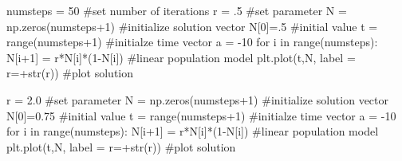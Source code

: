 \documentclass[
  letterpaper,
  DIV=11,
  numbers=noendperiod]{scrreprt}
\newenvironment{Shaded}{\begin{snugshade}}{\end{snugshade}}
\newcommand{\BuiltInTok}[1]{\textcolor[rgb]{0.00,0.23,0.31}{#1}}
\newcommand{\CommentTok}[1]{\textcolor[rgb]{0.37,0.37,0.37}{#1}}
\newcommand{\ControlFlowTok}[1]{\textcolor[rgb]{0.00,0.23,0.31}{#1}}
\newcommand{\DecValTok}[1]{\textcolor[rgb]{0.68,0.00,0.00}{#1}}
\newcommand{\FloatTok}[1]{\textcolor[rgb]{0.68,0.00,0.00}{#1}}
\newcommand{\KeywordTok}[1]{\textcolor[rgb]{0.00,0.23,0.31}{#1}}
\newcommand{\NormalTok}[1]{\textcolor[rgb]{0.00,0.23,0.31}{#1}}
\newcommand{\OperatorTok}[1]{\textcolor[rgb]{0.37,0.37,0.37}{#1}}
\newcommand{\StringTok}[1]{\textcolor[rgb]{0.13,0.47,0.30}{#1}}
\begin{document}
\begin{Shaded}
\begin{Highlighting}[]
\NormalTok{numsteps }\OperatorTok{=} \DecValTok{50} \CommentTok{\#set number of iterations}
\NormalTok{r }\OperatorTok{=} \FloatTok{.5} \CommentTok{\#set parameter}
\NormalTok{N }\OperatorTok{=}\NormalTok{ np.zeros(numsteps}\OperatorTok{+}\DecValTok{1}\NormalTok{) }\CommentTok{\#initialize solution vector}
\NormalTok{N[}\DecValTok{0}\NormalTok{]}\OperatorTok{=}\FloatTok{.5} \CommentTok{\#initial value}
\NormalTok{t }\OperatorTok{=} \BuiltInTok{range}\NormalTok{(numsteps}\OperatorTok{+}\DecValTok{1}\NormalTok{) }\CommentTok{\#initialze time vector}
\NormalTok{a }\OperatorTok{=} \OperatorTok{{-}}\DecValTok{10}
\ControlFlowTok{for}\NormalTok{ i }\KeywordTok{in} \BuiltInTok{range}\NormalTok{(numsteps):}
\NormalTok{    N[i}\OperatorTok{+}\DecValTok{1}\NormalTok{] }\OperatorTok{=}\NormalTok{ r}\OperatorTok{*}\NormalTok{N[i]}\OperatorTok{*}\NormalTok{(}\DecValTok{1}\OperatorTok{{-}}\NormalTok{N[i]) }\CommentTok{\#linear population model}
\NormalTok{plt.plot(t,N, label }\OperatorTok{=} \StringTok{\textquotesingle{}r=\textquotesingle{}}\OperatorTok{+}\BuiltInTok{str}\NormalTok{(r)) }\CommentTok{\#plot solution}


\NormalTok{r }\OperatorTok{=} \FloatTok{2.0} \CommentTok{\#set parameter}
\NormalTok{N }\OperatorTok{=}\NormalTok{ np.zeros(numsteps}\OperatorTok{+}\DecValTok{1}\NormalTok{) }\CommentTok{\#initialize solution vector}
\NormalTok{N[}\DecValTok{0}\NormalTok{]}\OperatorTok{=}\FloatTok{0.75} \CommentTok{\#initial value}
\NormalTok{t }\OperatorTok{=} \BuiltInTok{range}\NormalTok{(numsteps}\OperatorTok{+}\DecValTok{1}\NormalTok{) }\CommentTok{\#initialze time vector}
\NormalTok{a }\OperatorTok{=} \OperatorTok{{-}}\DecValTok{10}
\ControlFlowTok{for}\NormalTok{ i }\KeywordTok{in} \BuiltInTok{range}\NormalTok{(numsteps):}
\NormalTok{    N[i}\OperatorTok{+}\DecValTok{1}\NormalTok{] }\OperatorTok{=}\NormalTok{ r}\OperatorTok{*}\NormalTok{N[i]}\OperatorTok{*}\NormalTok{(}\DecValTok{1}\OperatorTok{{-}}\NormalTok{N[i]) }\CommentTok{\#linear population model}
\NormalTok{plt.plot(t,N, label }\OperatorTok{=} \StringTok{\textquotesingle{}r=\textquotesingle{}}\OperatorTok{+}\BuiltInTok{str}\NormalTok{(r)) }\CommentTok{\#plot solution}



\end{Highlighting}
\end{Shaded}
\end{document}
